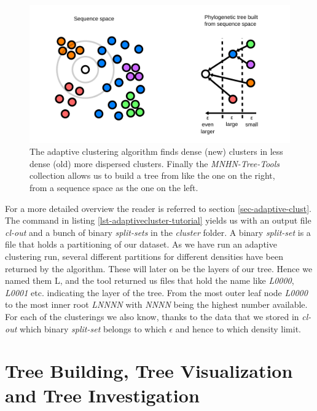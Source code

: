 \begin{figure}
  \includegraphics{densities-space.pdf}
  \caption{The adaptive clustering algorithm finds dense (new)
    clusters in less dense (old) more dispersed clusters. Finally the
    \emph{MNHN-Tree-Tools} collection allows us to build a tree from like
    the one on the right, from a sequence space as the one on the
    left.}
  \label{fig-adaptive-cluster}
\end{figure}
For a more detailed overview the reader is referred to section
\ref{sec-adaptive-clust}. 
The command in listing \ref{lst-adaptivecluster-tutorial} yields us
with an output file \emph{cl-out} and a bunch of binary
\emph{split-sets} in the
\emph{cluster} folder. A binary \emph{split-set} is a file that holds
a partitioning of our dataset. As we have run an adaptive clustering
run, several different partitions for different densities have been
returned by the algorithm. These will later on be the layers of our
tree. Hence we named them L, and the tool returned us files that hold
the name like \emph{L0000}, \emph{L0001} etc. indicating the layer of
the tree. From the most outer leaf node \emph{L0000} to the most inner
root \emph{LNNNN} with \emph{NNNN} being the highest number
available. For each of the clusterings we also know, thanks to the
data that we stored in \emph{cl-out} which binary \emph{split-set}
belongs to which $\epsilon$ and hence to which density limit.

\section{Tree Building, Tree Visualization and Tree Investigation}

